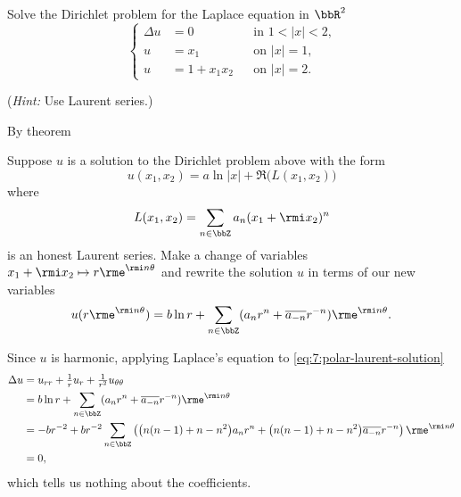 \begin{problem}
  Solve the Dirichlet problem for the Laplace equation in \(\bbR^2\)
  \[
    \left\{
      \begin{aligned}
        \Delta u&=0&&\text{in \(1<|x|<2\),}\\
        u&=x_1&&\text{on \(|x|=1\),}\\
        u&=1+x_1x_2&&\text{on \(|x|=2\).}
      \end{aligned}
    \right.
  \]

  \noindent (\emph{Hint:} Use Laurent series.)
\end{problem}
\begin{solution}
  By theorem

  Suppose \(u\) is a solution to the Dirichlet problem above with the form
  \[
    u(x_1,x_2)=a\ln|x|+\Re\bigl(L(x_1,x_2)\bigr)
  \]
  where
  \[
    L(x_1,x_2)=\sum_{n\in\bbZ} a_n(x_1+\rmi x_2)^n
  \]
  is an honest Laurent series. Make a change of variables
  \(x_1+\rmi x_2\mapsto r\rme^{\rmi n\theta}\) and rewrite the solution \(u\)
  in terms of our new variables
  \begin{equation}
    \label{eq:7:polar-laurent-solution}
    u(r\rme^{\rmi n\theta})
    =b\ln r+\sum_{n\in\bbZ} (a_n r^n+\overline{a_{-n}}r^{-n})\rme^{\rmi n\theta}.
  \end{equation}

  Since \(u\) is harmonic, applying Laplace's equation to
  \eqref{eq:7:polar-laurent-solution}
  \begin{align*}
    \Delta u
     &=u_{rr}+\tfrac{1}{r}u_r+\tfrac{1}{r^2}u_{\theta\theta}\\
     &=b\ln r+\sum_{n\in\bbZ} (a_n r^n+\overline{a_{-n}}r^{-n})\rme^{\rmi
       n\theta}\\
     &=-br^{-2}+br^{-2}
       \sum_{n\in\bbZ}
      \left(
      \bigl(n(n-1)+n-n^2\bigr)a_nr^n
      +\bigl(n(n-1)+n-n^2\bigr)\overline{a_{-n}}r^{-n}\right)\rme^{\rmi
       n\theta}\\
    &=0,
  \end{align*}
  which tells us nothing about the coefficients.
\end{solution}
\newpage

